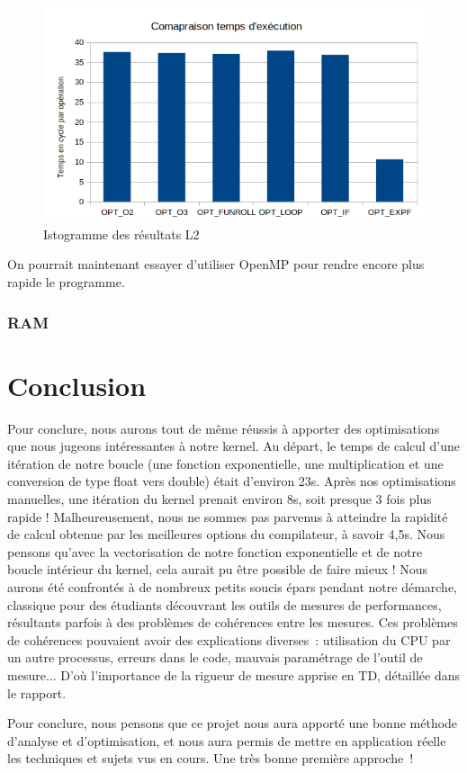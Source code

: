 \documentclass[12pt,a4paper]{article}
\begin{document}
\begin{figure}[ht]
    \centering
    \includegraphics[scale=0.6]{figures/L2/L2DiagResult.png}
    \caption{Istogramme des résultats L2}
\end{figure}


On pourrait maintenant essayer d'utiliser OpenMP pour rendre encore plus rapide 
le programme.

\subsubsection{RAM}

\newpage
\section{Conclusion}

Pour conclure, nous aurons tout de même réussis à apporter des optimisations que
nous jugeons intéressantes à notre kernel. Au départ, le temps de calcul d'une
itération de notre boucle (une fonction exponentielle, une multiplication et une
conversion de type float vers double) était d'environ 23s. Après nos
optimisations manuelles, une itération du kernel prenait environ 8s, soit
presque 3 fois plus rapide ! Malheureusement, nous ne sommes pas parvenus à
atteindre la rapidité de calcul obtenue par les meilleures options du
compilateur, à savoir 4,5s. Nous pensons qu'avec la vectorisation de notre
fonction exponentielle et de notre boucle intérieur du kernel, cela aurait pu
être possible de faire mieux !
Nous aurons été confrontés à de nombreux petits soucis épars pendant notre
démarche, classique pour des étudiants découvrant les outils de mesures de
performances, résultants parfois à des problèmes de cohérences entre les
mesures. Ces problèmes de cohérences pouvaient avoir des explications diverses :
utilisation du CPU par un autre processus, erreurs dans le code, mauvais
paramétrage de l'outil de mesure... D'où l'importance de la rigueur de mesure
apprise en TD, détaillée dans le rapport.

Pour conclure, nous pensons que ce projet nous aura apporté une bonne méthode
d'analyse et d'optimisation, et nous aura permis de mettre en application réelle
les techniques et sujets vus en cours. Une très bonne première approche !
\end{document}
